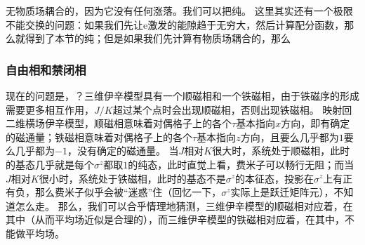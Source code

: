 \documentclass[hyperref, UTF8, a4paper]{ctexart}
\newcommand*{\Ztwo}{$\mathbb{Z}_2$}
\begin{document}
无物质场耦合的，因为它没有任何涨落。我们可以把纯。
这里其实还有一个极限不能交换的问题：如果我们先让e激发的能隙趋于无穷大，然后计算配分函数，那么就得到了本节的纯；但是如果我们先计算有物质场耦合的，那么 %

\subsubsection{自由相和禁闭相}

现在的问题是，？三维伊辛模型具有一个顺磁相和一个铁磁相，由于铁磁序的形成需要更多相互作用，$J/K$超过某个点时会出现顺磁相，否则出现铁磁相。
映射回二维横场伊辛模型，顺磁相意味着对偶格子上的各个$\tau$基本指向$x$方向，即有确定的磁通量；铁磁相意味着对偶格子上的各个$\tau$基本指向$z$方向，且要么几乎都为$1$要么几乎都为$-1$，没有确定的磁通量。
当$J$相对$K$很大时，系统处于顺磁相，此时的基态几乎就是每个$\sigma^z$都取$1$的纯态，此时直觉上看，费米子可以畅行无阻；而当$J$相对$K$很小时，系统处于铁磁相，此时的基态不是$\sigma^z$的本征态，投影在$\sigma^z$上有正有负，那么费米子似乎会被“迷惑”住（回忆一下，$\sigma^z$实际上是跃迁矩阵元），不知道怎么走。
那么，我们可以合乎情理地猜测，三维伊辛模型的顺磁相对应着，在其中（从而平均场近似是合理的），而三维伊辛模型的铁磁相对应着，在其中，不能做平均场。
\end{document}
